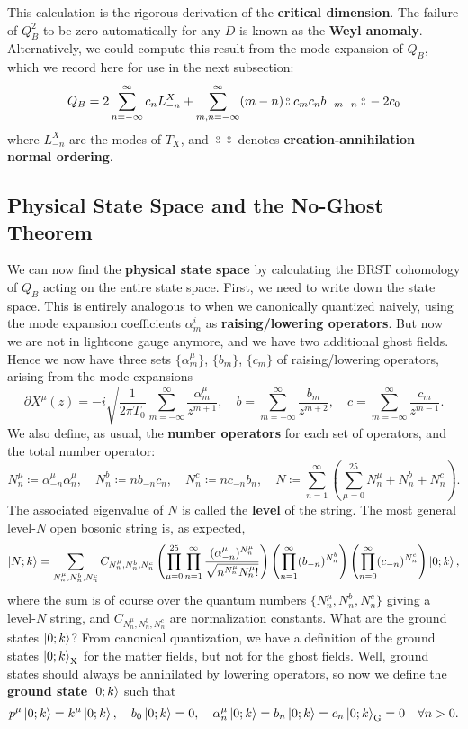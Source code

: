 \documentclass{report}
\theoremstyle{plain}
\theoremstyle{definition}
\theoremstyle{remark}
\newcommand{\di}{\partial}
\newcommand{\circcolon}{\mathbin{\raise 0.75ex\hbox{\oalign{$\scriptscriptstyle\mathrm{o}$\cr$\scriptscriptstyle\mathrm{o}$}}}}
\newcommand{\CANO}[1]{\,\circcolon\mathrel{#1}\circcolon\,}
\begin{document}
This calculation is the rigorous derivation of the {\bf critical
  dimension}. The failure of $Q_B^2$ to be zero automatically for any
$D$ is known as the {\bf Weyl anomaly}. Alternatively, we could
compute this result from the mode expansion of $Q_B$, which we record
here for use in the next subsection:
\[ Q_B = 2\sum_{n=-\infty}^\infty c_n L_{-n}^X + \sum_{m,n=-\infty}^\infty (m - n) \CANO{c_m c_n b_{-m-n}} - 2c_0 \]
where $L_{-n}^X$ are the modes of $T_X$, and $\CANO{}$ denotes {\bf
  creation-annihilation normal ordering}.

\subsection{Physical State Space and the No-Ghost Theorem}

We can now find the {\bf physical state space} by calculating the BRST
cohomology of $Q_B$ acting on the entire state space. First, we need
to write down the state space. This is entirely analogous to when we
canonically quantized naively, using the mode expansion coefficients
$\alpha_m^i$ as {\bf raising/lowering operators}. But now we are not
in lightcone gauge anymore, and we have two additional ghost fields.
Hence we now have three sets $\{\alpha_m^\mu\}$, $\{b_m\}$, $\{c_m\}$
of raising/lowering operators, arising from the mode expansions
\[ \di X^\mu(z) = -i\sqrt{\frac{1}{2 \pi T_0}} \sum_{m=-\infty}^\infty \frac{\alpha_m^\mu}{z^{m+1}}, \quad b = \sum_{m=-\infty}^\infty \frac{b_m}{z^{m+2}}, \quad c = \sum_{m=-\infty}^\infty \frac{c_m}{z^{m-1}}. \]
We also define, as usual, the {\bf number operators} for each set of
operators, and the total number operator:
\[ N_n^\mu \coloneqq \alpha^\mu_{-n} \alpha^\mu_n, \quad N_n^b \coloneqq nb_{-n} c_n, \quad N_n^c \coloneqq nc_{-n} b_n, \quad N \coloneqq \sum_{n=1}^\infty \left(\sum_{\mu=0}^{25} N_n^\mu + N_n^b + N_n^c\right). \]
The associated eigenvalue of $N$ is called the {\bf level} of the
string. The most general level-$N$ open bosonic string is, as
expected,
\[ \ket{N; k} = \sum_{N_n^{\mu}, N_n^b, N_n^c} C_{N_n^{\mu}, N_n^b, N_n^c} \left(\prod_{\mu=0}^{25} \prod_{n=1}^\infty \frac{(\alpha^\mu_{-n})^{N_n^\mu}}{\sqrt{n^{N_n^\mu} N_n^\mu!}}\right) \left(\prod_{n=1}^\infty (b_{-n})^{N_n^b}\right) \left(\prod_{n=0}^\infty (c_{-n})^{N_n^c}\right) \ket{0; k}, \]
where the sum is of course over the quantum numbers $\{N_n^{\mu},
N_n^b, N_n^c\}$ giving a level-$N$ string, and $C_{N_n^{\mu}, N_n^b,
  N_n^c}$ are normalization constants. What are the ground states
$\ket{0; k}$? From canonical quantization, we have a definition of the
ground states $\ket{0; k}_{\text{X}}$ for the matter fields, but not
for the ghost fields. Well, ground states should always be annihilated
by lowering operators, so now we define the {\bf ground state}
$\ket{0; k}$ such that
\[ p^\mu \ket{0; k} = k^\mu \ket{0; k}, \quad b_0\ket{0; k} = 0, \quad \alpha_n^\mu\ket{0; k} = b_n\ket{0; k} = c_n\ket{0; k}_{\text{G}} = 0 \quad \forall n > 0. \]
\end{document}

